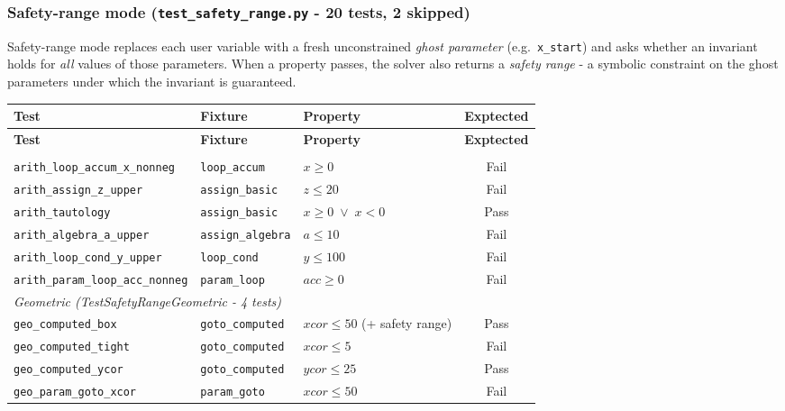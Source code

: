 \subsubsection*{Safety-range mode \textnormal{(\texttt{test\_safety\_range.py} - 20 tests, 2 skipped)}}

Safety-range mode replaces each user variable with a fresh unconstrained
\emph{ghost parameter} (e.g.\ \texttt{x\_start}) and asks whether an invariant
holds for \emph{all} values of those parameters.  When a property passes, the
solver also returns a \emph{safety range} - a symbolic constraint on the ghost
parameters under which the invariant is guaranteed.

{\small
\begin{longtable}{p{} p{} p{} c}
\toprule
\textbf{Test} & \textbf{Fixture} & \textbf{Property} & \textbf{Exptected} \\
\midrule
\endfirsthead
\toprule
\textbf{Test} & \textbf{Fixture} & \textbf{Property} & \textbf{Exptected} \\
\midrule
\endhead
\bottomrule
\endfoot
\bottomrule
\endlastfoot

\multicolumn{4}{l}{\textit{Arithmetic (TestSafetyRangeArithmetic - 6 tests)}} \\
\midrule
\texttt{arith\_loop\_accum\_x\_nonneg}     & \texttt{loop\_accum}     & $x \geq 0$              & Fail \\
\texttt{arith\_assign\_z\_upper}           & \texttt{assign\_basic}   & $z \leq 20$             & Fail \\
\texttt{arith\_tautology}                  & \texttt{assign\_basic}   & $x \geq 0 \;\lor\; x < 0$ & Pass \\
\texttt{arith\_algebra\_a\_upper}          & \texttt{assign\_algebra} & $a \leq 10$             & Fail \\
\texttt{arith\_loop\_cond\_y\_upper}       & \texttt{loop\_cond}      & $y \leq 100$            & Fail \\
\texttt{arith\_param\_loop\_acc\_nonneg}   & \texttt{param\_loop}     & $\mathit{acc} \geq 0$   & Fail \\

\midrule
\multicolumn{4}{l}{\textit{Geometric (TestSafetyRangeGeometric - 4 tests)}} \\
\midrule
\texttt{geo\_computed\_box}                & \texttt{goto\_computed}  & $\mathit{xcor} \leq 50$ (+ safety range) & Pass \\
\texttt{geo\_computed\_tight}              & \texttt{goto\_computed}  & $\mathit{xcor} \leq 5$   & Fail \\
\texttt{geo\_computed\_ycor}               & \texttt{goto\_computed}  & $\mathit{ycor} \leq 25$  & Pass \\
\texttt{geo\_param\_goto\_xcor}            & \texttt{param\_goto}     & $\mathit{xcor} \leq 50$  & Fail \\


\end{longtable}}
